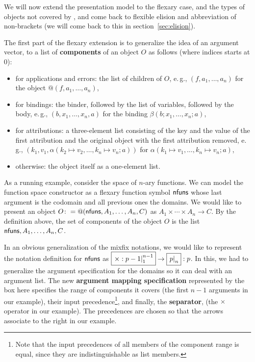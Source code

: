 \documentclass[a4paper]{article}
\def\defemph#1{{\bf{#1}}}
\def\imarg#1#2{\fbox{\ensuremath{\left.#1\right|_{#2}}}}
\def\fimarg#1#2#3{\fbox{\ensuremath{\left.#1\right|_{#2}^{#3}}}}
\def\recu#1{#1}%
\begin{document}
We will now extend the presentation model to the flexary case, and the types of
{\openmath} objects not covered by {\isabelle}, and come back to flexible elision and
abbreviation of non-brackets (we will come back to this in section~\ref{sec:elision}).
  
The first part of the flexary extension is to generalize the idea of an argument vector,
to a list of {\defemph{components}} of an {\openmath} object $O$ as follows (where indices
starts at $0$):
\begin{itemize}
\item for applications and errors: the list of children of $O$, e.\,g.,
  $(f,a_1,\ldots,a_n)$ for the object $@(f,a_1,\ldots,a_n)$,
\item for bindings: the binder, followed by the list of variables, followed by the body,
  e.\,g., $(b,x_1,\ldots,x_n,a)$ for the binding $\beta(b;x_1,\ldots,x_n;a)$,
\item for attributions: a three-element list consisting of the key and the value of the
  first attribution and the original object with the first attribution removed, e.\,g.,
  $(k_1,v_1,\alpha(k_2\mapsto v_2,\ldots,k_n\mapsto v_n;a))$ for $\alpha(k_1\mapsto
  v_1,\ldots,k_n\mapsto v_n;a)$,
\item otherwise: the object itself as a one-element list.
\end{itemize}
As a running example, consider the space of $n$-ary functions. We can model the function
space constructor as a flexary function symbol ${\sf{nfuns}}$ whose last argument is the
codomain and all previous ones the domains. We would like to present an {\openmath} object
$O\colon=@({\sf{nfuns}},A_1,\ldots,A_n,C)$ as $A_1\times \cdots \times A_n\to C$. By the
definition above, the set of components of the object $O$ is the list
${\sf{nfuns}},A_1,\ldots,A_n,C$.

In an obvious generalization of the mixfix notations, we would like to represent the
notation definition for $\sf{nfuns}$ as
$\fimarg{\times:\recu{p-1}}{1}{n-1}\to\imarg{\recu{p}}{n}:p$. In this, we had to
generalize the argument specification for the domains so it can deal with an argument
list. The new {\defemph{argument mapping specification}} represented by the box here
specifies the range of components it covers (the first $n-1$ arguments in our example),
their input precedence\footnote{Note that the input precedences of all members of the
  component range is equal, since they are indistinguishable as list members.}, and
finally, the {\defemph{separator}}, (the $\times$ operator in our example). The
precedences are chosen so that the arrows associate to the right in our example.
  
\end{document}
